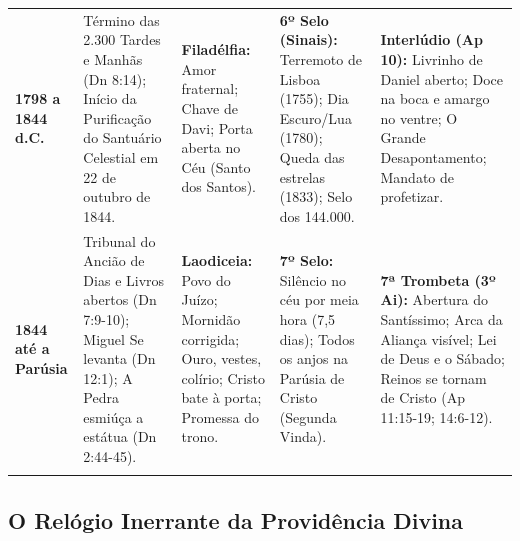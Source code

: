 \begin{table}[htbp]
\begin{tabularx}{\textwidth}{>{\raggedright\arraybackslash}p{} >{\raggedright\arraybackslash}X >{\raggedright\arraybackslash}X >{\raggedright\arraybackslash}X >{\raggedright\arraybackslash}X}
\addlinespace[3pt]
\textbf{1798 a 1844 d.C.} & Término das 2.300 Tardes e Manhãs (Dn 8:14); Início da Purificação do Santuário Celestial em 22 de outubro de 1844. & \textbf{Filadélfia:} Amor fraternal; Chave de Davi; Porta aberta no Céu (Santo dos Santos). & \textbf{6º Selo (Sinais):} Terremoto de Lisboa (1755); Dia Escuro/Lua (1780); Queda das estrelas (1833); Selo dos 144.000. & \textbf{Interlúdio (Ap 10):} Livrinho de Daniel aberto; Doce na boca e amargo no ventre; O Grande Desapontamento; Mandato de profetizar. \\
\addlinespace[3pt]
\textbf{1844 até a Parúsia} & Tribunal do Ancião de Dias e Livros abertos (Dn 7:9-10); Miguel Se levanta (Dn 12:1); A Pedra esmiúça a estátua (Dn 2:44-45). & \textbf{Laodiceia:} Povo do Juízo; Mornidão corrigida; Ouro, vestes, colírio; Cristo bate à porta; Promessa do trono. & \textbf{7º Selo:} Silêncio no céu por meia hora (7,5 dias); Todos os anjos na Parúsia de Cristo (Segunda Vinda). & \textbf{7ª Trombeta (3º Ai):} Abertura do Santíssimo; Arca da Aliança visível; Lei de Deus e o Sábado; Reinos se tornam de Cristo (Ap 11:15-19; 14:6-12). \\
\addlinespace[3pt]
\bottomrule
\end{tabularx}
\end{table}




\subsection{O Relógio Inerrante da Providência Divina}


